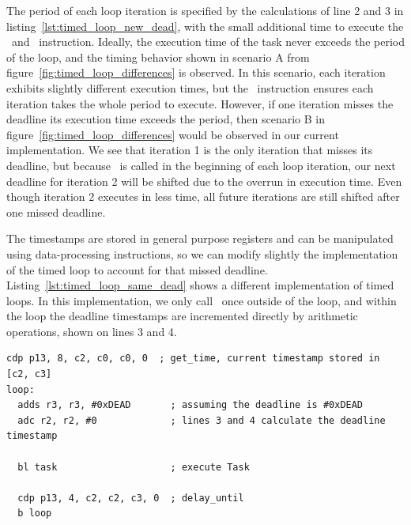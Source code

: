The period of each loop iteration is specified by the calculations of line 2 and 3 in listing~\ref{lst:timed_loop_new_dead}, with the small additional time to execute the \gettime\ and \delayuntil\ instruction. 
Ideally, the execution time of the task never exceeds the period of the loop, and the timing behavior shown in scenario A from figure~\ref{fig:timed_loop_differences} is observed. 
In this scenario, each iteration exhibits slightly different execution times, but the \delayuntil\ instruction ensures each iteration takes the whole period to execute.
However, if one iteration misses the deadline its execution time exceeds the period, then scenario B in figure~\ref{fig:timed_loop_differences} would be observed in our current implementation.
We see that iteration 1 is the only iteration that misses its deadline, but because \gettime\ is called in the beginning of each loop iteration, our next deadline for iteration 2 will be shifted due to the overrun in execution time. 
Even though iteration 2 executes in less time, all future iterations are still shifted after one missed deadline.

The timestamps are stored in general purpose registers and can be manipulated using data-processing instructions, so we can modify slightly the implementation of the timed loop to account for that missed deadline. 
Listing~\ref{lst:timed_loop_same_dead} shows a different implementation of timed loops.
In this implementation, we only call \gettime\ once outside of the loop, and within the loop the deadline timestamps are incremented directly by arithmetic operations, shown on lines 3 and 4.    

\begin{lstlisting}[float=h, label=lst:timed_loop_same_dead,caption=Timed loops with get\_time outside of the loop ]
  cdp p13, 8, c2, c0, c0, 0  ; get_time, current timestamp stored in [c2, c3]
loop:
  adds r3, r3, #0xDEAD       ; assuming the deadline is #0xDEAD
  adc r2, r2, #0             ; lines 3 and 4 calculate the deadline timestamp
   
  bl task                    ; execute Task
  
  cdp p13, 4, c2, c2, c3, 0  ; delay_until 
  b loop
\end{lstlisting}

